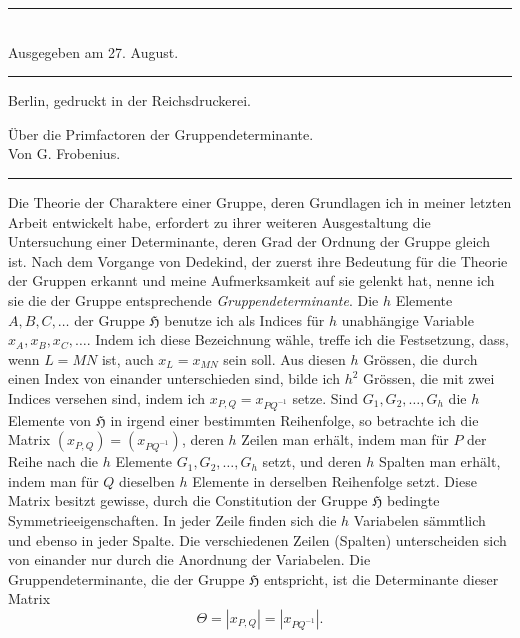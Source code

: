 \documentclass[11pt]{article}
\newcommand{\Hgrp}{\mathfrak{H}}
\begin{document}
\begin{center}
\rule{11em}{0.4pt}\\[-0.2em]
Ausgegeben am 27. August.\\[-0.2em]
\rule{11em}{0.4pt}

{\small Berlin, gedruckt in der Reichsdruckerei.}
\end{center}

\clearpage

\begin{center}
{\Large Über die Primfactoren der Gruppendeterminante.}\\[0.65em]
Von G. Frobenius.\\[0.6em]
\rule{0.22\linewidth}{0.4pt}
\end{center}

Die Theorie der Charaktere einer Gruppe, deren Grundlagen ich in meiner letzten Arbeit entwickelt habe, erfordert zu ihrer weiteren Ausgestaltung die Untersuchung einer Determinante, deren Grad der Ordnung der Gruppe gleich ist. Nach dem Vorgange von Dedekind, der zuerst ihre Bedeutung für die Theorie der Gruppen erkannt und meine Aufmerksamkeit auf sie gelenkt hat, nenne ich sie die der Gruppe entsprechende \emph{Gruppendeterminante}. Die $h$ Elemente $A,B,C,\ldots$ der Gruppe $\Hgrp$ benutze ich als Indices für $h$ unabhängige Variable $x_A,x_B,x_C,\ldots$. Indem ich diese Bezeichnung wähle, treffe ich die Festsetzung, dass, wenn $L=MN$ ist, auch $x_L=x_{MN}$ sein soll. Aus diesen $h$ Grössen, die durch einen Index von einander unterschieden sind, bilde ich $h^2$ Grössen, die mit zwei Indices versehen sind, indem ich $x_{P,Q}=x_{PQ^{-1}}$ setze. Sind $G_1,G_2,\ldots,G_h$ die $h$ Elemente von $\Hgrp$ in irgend einer bestimmten Reihenfolge, so betrachte ich die Matrix $(x_{P,Q})=(x_{PQ^{-1}})$, deren $h$ Zeilen man erhält, indem man für $P$ der Reihe nach die $h$ Elemente $G_1,G_2,\ldots,G_h$ setzt, und deren $h$ Spalten man erhält, indem man für $Q$ dieselben $h$ Elemente in derselben Reihenfolge setzt. Diese Matrix besitzt gewisse, durch die Constitution der Gruppe $\Hgrp$ bedingte Symmetrieeigenschaften. In jeder Zeile finden sich die $h$ Variabelen sämmtlich und ebenso in jeder Spalte. Die verschiedenen Zeilen (Spalten) unterscheiden sich von einander nur durch die Anordnung der Variabelen. Die Gruppendeterminante, die der Gruppe $\Hgrp$ entspricht, ist die Determinante dieser Matrix
\[
\Theta=|x_{P,Q}|=|x_{PQ^{-1}}|.
\]
\end{document}

